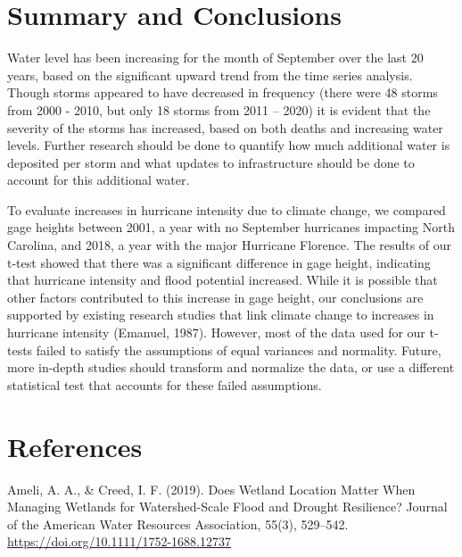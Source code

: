 \documentclass[
  12pt,
]{article}
\begin{document}
\newpage

\hypertarget{summary-and-conclusions}{%
\section{Summary and Conclusions}\label{summary-and-conclusions}}

Water level has been increasing for the month of September over the last
20 years, based on the significant upward trend from the time series
analysis. Though storms appeared to have decreased in frequency (there
were 48 storms from 2000 - 2010, but only 18 storms from 2011 -- 2020)
it is evident that the severity of the storms has increased, based on
both deaths and increasing water levels. Further research should be done
to quantify how much additional water is deposited per storm and what
updates to infrastructure should be done to account for this additional
water.

To evaluate increases in hurricane intensity due to climate change, we
compared gage heights between 2001, a year with no September hurricanes
impacting North Carolina, and 2018, a year with the major Hurricane
Florence. The results of our t-test showed that there was a significant
difference in gage height, indicating that hurricane intensity and flood
potential increased. While it is possible that other factors contributed
to this increase in gage height, our conclusions are supported by
existing research studies that link climate change to increases in
hurricane intensity (Emanuel, 1987). However, most of the data used for
our t-tests failed to satisfy the assumptions of equal variances and
normality. Future, more in-depth studies should transform and normalize
the data, or use a different statistical test that accounts for these
failed assumptions.

\newpage

\hypertarget{references}{%
\section{References}\label{references}}

\setlength{\parindent}{-0.2in}
\setlength{\leftskip}{0.2in}
\setlength{\parskip}{8pt}

\noindent

Ameli, A. A., \& Creed, I. F. (2019). Does Wetland Location Matter When
Managing Wetlands for Watershed-Scale Flood and Drought Resilience?
Journal of the American Water Resources Association, 55(3), 529--542.
\url{https://doi.org/10.1111/1752-1688.12737}
\end{document}
